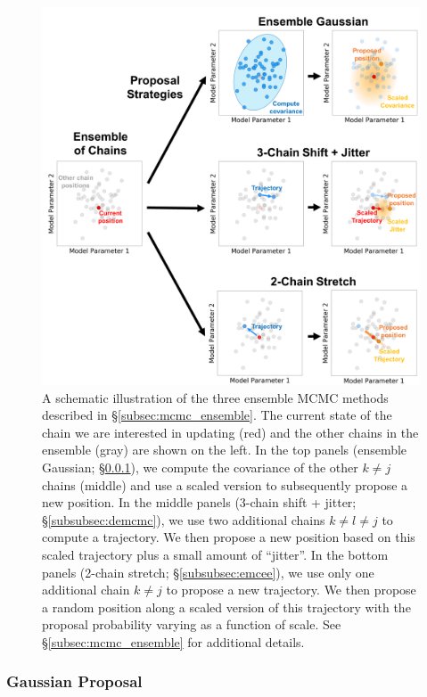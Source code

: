 \documentclass[12pt, titlepage]{article}
\begin{document}
\begin{figure}
\begin{center}
\includegraphics[width=\textwidth]{figures/fig14.png}
\end{center}
\caption{A schematic illustration of the three ensemble MCMC
methods described in \S\ref{subsec:mcmc_ensemble}. 
The current state of the chain we are interested in updating (red)
and the other chains in the ensemble (gray) are shown on the left.
In the top panels (ensemble Gaussian; \S\ref{subsubsec:ensemble_gauss}),
we compute the covariance of the other $k \neq j$
chains (middle) and use a scaled version to subsequently
propose a new position. 
In the middle panels (3-chain shift + jitter; \S\ref{subsubsec:demcmc}),
we use two additional chains $k \neq l \neq j$ to compute a trajectory. 
We then propose a new position based on this scaled trajectory plus
a small amount of ``jitter''. 
In the bottom panels (2-chain stretch; \S\ref{subsubsec:emcee}), we use
only one additional chain $k \neq j$ to propose a new trajectory. We
then propose a random position along a scaled version of this
trajectory with the proposal probability 
varying as a function of scale.
See \S\ref{subsec:mcmc_ensemble} for additional details.
}\label{fig:mcmc_particles}
\end{figure}

\subsubsection{Gaussian Proposal} \label{subsubsec:ensemble_gauss}
\end{document}
